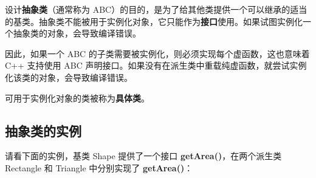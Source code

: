 \documentclass[
]{article}
\begin{document}
设计\textbf{抽象类}（通常称为
ABC）的目的，是为了给其他类提供一个可以继承的适当的基类。抽象类不能被用于实例化对象，它只能作为\textbf{接口}使用。如果试图实例化一个抽象类的对象，会导致编译错误。

因此，如果一个 ABC 的子类需要被实例化，则必须实现每个虚函数，这也意味着
C++ 支持使用 ABC
声明接口。如果没有在派生类中重载纯虚函数，就尝试实例化该类的对象，会导致编译错误。

可用于实例化对象的类被称为\textbf{具体类}。

\hypertarget{ux62bdux8c61ux7c7bux7684ux5b9eux4f8b}{%
\subsection{抽象类的实例}\label{ux62bdux8c61ux7c7bux7684ux5b9eux4f8b}}

请看下面的实例，基类 Shape 提供了一个接口
\textbf{getArea()}，在两个派生类 Rectangle 和 Triangle 中分别实现了
\textbf{getArea()}：
\end{document}
